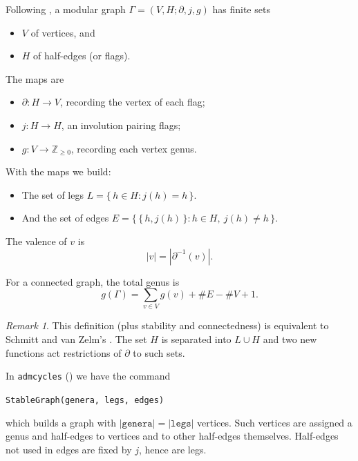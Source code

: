 \documentclass[11pt]{article}
\newcommand{\del}{\partial}
\theoremstyle{plain}
\theoremstyle{remark}
\newcommand{\bZ}{\mathbb{Z}}
\newcommand{\set}[1]{\{\,#1\,\}}
\newcommand{\Ga}{\Gamma}
\theoremstyle{plain}
\theoremstyle{definition}
\theoremstyle{remark}
\newtheorem*{nonum-Rmk}{Remark}
\begin{document}
\begin{ptcb}
\begin{Def}
\label{notes:def:modular-graph}
Following \cite[Definitions~1.1 and~1.5]{BM}, a modular graph
\(\Ga=(V,H;\del,j,g)\) has finite sets
\begin{itemize}
  \item \(V\) of vertices, and
  \item \(H\) of half-edges (or flags).
\end{itemize}
The maps are
\begin{itemize}
  \item \(\del:H\to V\), recording the vertex of each flag;
  \item \(j:H\to H\), an involution pairing flags;
  \item \(g:V\to\bZ_{\geq0}\), recording each vertex genus.
\end{itemize}
With the maps we build:
\begin{itemize}
  \item The set of legs \(L=\set{h\in H: j(h)=h}\).
  \item And the set of edges \(E=\set{\set{h,j(h)}:h\in H,\ j(h)\neq h}\).
\end{itemize}

The valence of \(v\) is
\[
|v|=|\del^{-1}(v)|.
\]
\end{Def}

For a connected graph, the total genus is
\[
g(\Ga)=\sum_{v\in V}g(v)+\#E-\#V+1.
\]

\begin{nonum-Rmk}
This definition (plus stability and connectedness) is equivalent to Schmitt and van Zelm's \cite[Definition~2.2]{notes:schmitt-vanzelm2018}. The set \(H\) is separated into \(L\cup H\) and two new functions act restrictions of \(\del\) to such sets.
\end{nonum-Rmk}

In \texttt{admcycles} (\cite{notes:admcycles-docs}) we have the command
\begin{center}
\texttt{StableGraph(genera, legs, edges)}
\end{center}
which builds a graph with \(|\texttt{genera}|=|\texttt{legs}|\) vertices. Such vertices are assigned a genus and half-edges to vertices and to other half-edges themselves. Half-edges not used in edges are fixed by \(j\), hence are legs.


\end{ptcb}
\end{document}
